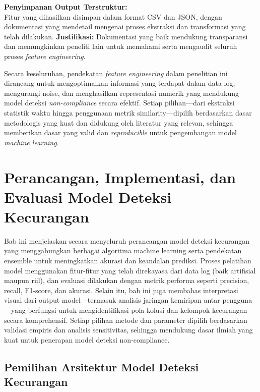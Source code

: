 \textbf{Penyimpanan Output Terstruktur:} \\
Fitur yang dihasilkan disimpan dalam format CSV dan JSON, dengan dokumentasi yang mendetail mengenai proses ekstraksi dan transformasi yang telah dilakukan.
\textbf{Justifikasi:} Dokumentasi yang baik mendukung transparansi dan memungkinkan peneliti lain untuk memahami serta mengaudit seluruh proses \textit{feature engineering}.

Secara keseluruhan, pendekatan \textit{feature engineering} dalam penelitian ini dirancang untuk mengoptimalkan informasi yang terdapat dalam data log, mengurangi noise, dan menghasilkan representasi numerik yang mendukung model deteksi \textit{non-compliance} secara efektif. Setiap pilihan—dari ekstraksi statistik waktu hingga penggunaan metrik similarity—dipilih berdasarkan dasar metodologis yang kuat dan didukung oleh literatur yang relevan, sehingga memberikan dasar yang valid dan \textit{reproducible} untuk pengembangan model \textit{machine learning}.


\section{Perancangan, Implementasi, dan Evaluasi Model Deteksi Kecurangan}
\label{sec:modelDeteksiKecurangan}

Bab ini menjelaskan secara menyeluruh perancangan model deteksi kecurangan yang menggabungkan berbagai algoritma machine learning serta pendekatan ensemble untuk meningkatkan akurasi dan keandalan prediksi. Proses pelatihan model menggunakan fitur-fitur yang telah direkayasa dari data log (baik artifisial maupun riil), dan evaluasi dilakukan dengan metrik performa seperti precision, recall, F1-score, dan akurasi. Selain itu, bab ini juga membahas interpretasi visual dari output model—termasuk analisis jaringan kemiripan antar pengguna—yang berfungsi untuk mengidentifikasi pola kolusi dan kelompok kecurangan secara komprehensif. Setiap pilihan metode dan parameter dipilih berdasarkan validasi empiris dan analisis sensitivitas, sehingga mendukung dasar ilmiah yang kuat untuk penerapan model deteksi non-compliance.

\subsection{Pemilihan Arsitektur Model Deteksi Kecurangan}
\label{subsec:pemilihanArsitekturModel}

